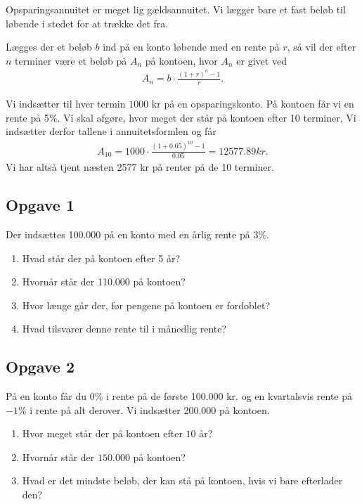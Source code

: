 Opsparingsannuitet er meget lig gældsannuitet. Vi lægger bare et fast beløb til løbende i stedet for at trække det fra. 

\begin{setn}[Opsparingsannuitet]
	Lægges der et beløb $b$ ind på en konto løbende med en rente på $r$, så vil der efter $n$ terminer være et 
	beløb på $A_n$ på kontoen, hvor $A_n$ er givet ved
	\begin{align*}
		A_n = b\cdot \frac{(1+r)^n-1}{r}.
	\end{align*}
\end{setn}

\begin{exa}
	Vi indsætter til hver termin $1000$ kr på en opsparingskonto. På kontoen får vi en rente på 5$\%$. Vi skal
	afgøre, hvor meget der står på kontoen efter 10 terminer. Vi indsætter derfor tallene i annuitetsformlen og får
	\begin{align*}
		A_{10} = 1000\cdot \frac{(1+0.05)^10-1}{0.05} = 12577.89kr.	
	\end{align*}	 
	Vi har altså tjent næsten 2577 kr på renter på de 10 terminer.  
\end{exa}


\subsection*{Opgave 1}
Der indsættes 100.000 på en konto med en årlig rente på $3\%$. 
\begin{enumerate}[label=\roman*)]
\item Hvad står der på kontoen efter 5 år?
\item Hvornår står der 110.000 på kontoen?
\item Hvor længe går der, før pengene på kontoen er fordoblet?
\item Hvad tilsvarer denne rente til i månedlig rente?
\end{enumerate}


\subsection*{Opgave 2}
På en konto får du $0\%$ i rente på de første 100.000 kr. og en kvartalsvis rente på $-1\%$ i rente på alt derover. Vi indsætter $200.000$ på kontoen.
\begin{enumerate}[label=\roman*)]
\item Hvor meget står der på kontoen efter $10$ år?
\item Hvornår står der $150.000$ på kontoen?
\item Hvad er det mindste beløb, der kan stå på kontoen, hvis vi bare efterlader den?
\end{enumerate}


